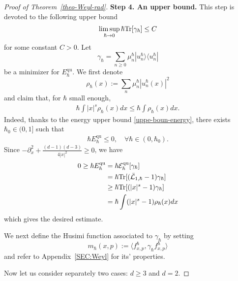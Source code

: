 \documentclass[%
11pt,  reqno]{amsart}
\theoremstyle{remarkstyle}
\newcommand{\1}{\hspace{0.2mm}\text{I}\hspace{0.2mm}}
\renewcommand{\L}{\mathcal{L}}
\newcommand{\jb}[1]
{\langle #1 \rangle}
\DeclareMathOperator*{\qua}{qu}
\numberwithin{equation}{section}
\numberwithin{theorem}{section}
\begin{document}
\begin{proof}[Proof of Theorem~\ref{theo-Weyl-rad}]
		{\bf Step 4. An upper bound.} This step is devoted to the following upper bound
		\begin{align} \label{uppe-boun-trace}
			\limsup_{\hbar \to 0} \hbar {\rm Tr}[\gamma_\hbar] \leq C
		\end{align}
		for some constant $C>0$.  Let 
		$$\gamma_\hbar = \sum_{n\geq 0} \mu_n^{\hbar} |u^{\hbar}_n\rangle \langle u^{\hbar}_n|$$
		be a minimizer for $E^{\qua}_{\hbar}$. We first denote 
		$$ \rho_{\hbar}(x) := \sum_n \mu_n^{\hbar} |u^{\hbar}_n(x)|^2$$
		and claim that, for $\hbar$ small enough, 
		\begin{align} \label{densi-gamma}
			\hbar \int |x|^s \rho_{\hbar}(x) dx \leq \hbar \int \rho_\hbar(x) dx.
		\end{align}		
		Indeed, thanks to the energy upper bound \eqref{uppe-boun-energy}, there exists $\hbar_0 \in (0,1]$ such that 
		\begin{align} \label{nega-energy}
			\hbar E^{\qua}_{\hbar} \leq 0, \quad \forall\hbar \in (0,\hbar_0).
		\end{align} 
		Since $-\partial^2_x +\frac{(d-1)(d-3)}{4|x|^2} \geq 0$, we have
		\begin{align*}
			0 \geq \hbar E^{\qua}_{\hbar} &= \hbar \mathcal E^{\qua}_{\hbar}[\gamma_{\hbar}] \\
			&= \hbar {\rm Tr}[(\bar{\L}_{1,\hbar}-1)\gamma_{\hbar}]\\
			&\geq \hbar {\rm Tr}[(|x|^s-1)\gamma_\hbar] \\
			&= \hbar \int (|x|^s-1)\rho_\hbar(x) dx
		\end{align*}
		which gives the desired estimate.
		
		
		We next define the Husimi function associated to $\gamma_{\hbar}$ by setting
		\[
		m_{\hbar}(x,p) := \jb{f^{\hbar}_{x,p}, \gamma_{\hbar}f^{\hbar}_{x,p}}
		\]
		and refer to Appendix~\ref{SEC:Weyl} for its' properties.
		
		Now let us consider separately two cases: $d\geq 3$ and $d=2$.
		
		\medskip
		

\end{proof}
\end{document}
